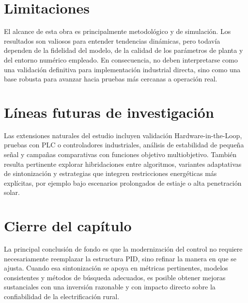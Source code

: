 \section{Limitaciones}
El alcance de esta obra es principalmente metodológico y de simulación. Los resultados son
valiosos para entender tendencias dinámicas, pero todavía dependen de la fidelidad del modelo,
de la calidad de los parámetros de planta y del entorno numérico empleado. En consecuencia,
no deben interpretarse como una validación definitiva para implementación industrial directa,
sino como una base robusta para avanzar hacia pruebas más cercanas a operación real.

\section{Líneas futuras de investigación}
Las extensiones naturales del estudio incluyen validación Hardware-in-the-Loop, pruebas con
PLC o controladores industriales, análisis de estabilidad de pequeña señal y campañas
comparativas con funciones objetivo multiobjetivo. También resulta pertinente explorar
hibridaciones entre algoritmos, variantes adaptativas de sintonización y estrategias que integren
restricciones energéticas más explícitas, por ejemplo bajo escenarios prolongados de estiaje o
alta penetración solar.

\section{Cierre del capítulo}
La principal conclusión de fondo es que la modernización del control no requiere necesariamente
reemplazar la estructura PID, sino refinar la manera en que se ajusta. Cuando esa sintonización
se apoya en métricas pertinentes, modelos consistentes y métodos de búsqueda adecuados, es
posible obtener mejoras sustanciales con una inversión razonable y con impacto directo sobre la
confiabilidad de la electrificación rural.
